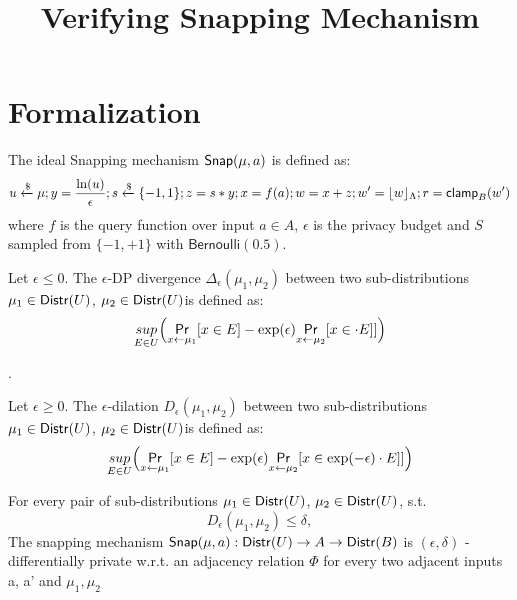 \documentclass{article}
\begin{document}
\title{Verifying Snapping Mechanism}

\maketitle

\section{Formalization}
\begin{defn}
The ideal Snapping mechanism $\mathsf{Snap}(\mu, a)$ is defined as:
\[
	u \xleftarrow{\$} \mu; y = \frac{\ln (u)}{\epsilon}; s \xleftarrow{\$} \{-1, 1\}; z = s * y; x = f(a); w = x + z; w' = \lfloor w \rfloor_{\Lambda}; r = \mathsf{clamp}_B (w')
\]
where $f$ is the query function over input $a \in A$, $\epsilon$ is the privacy budget and $S$ sampled from $ \{-1, +1\}$ with $\mathsf{Bernoulli}(0.5)$.
\end{defn}

\begin{defn}
Let $\epsilon \leq 0$. The $\epsilon${\text -DP divergence} $\Delta_{\epsilon}(\mu_1, \mu_2)$ between two sub-distributions $\mu_1 \in \mathsf{Distr}(U)$, $\mu_2 \in \mathsf{Distr}(U)$is defined as:
\[	
	\underset{E \in U}{sup}\Big(\underset{x \leftarrow \mu_1}{\mathsf{Pr}}[x \in E] - \exp(\epsilon) \underset{x \leftarrow \mu_2}{\mathsf{Pr}}[x \in \cdot E]]\Big)
\]

\end{defn}

\begin{defn}
.

Let $\epsilon \geq 0$. The $\epsilon$-dilation $D_{\epsilon}(\mu_1, \mu_2)$ between two sub-distributions $\mu_1 \in \mathsf{Distr}(U)$, $\mu_2 \in \mathsf{Distr}(U)$is defined as:
\[	
	\underset{E \in U}{sup}\Big(\underset{x \leftarrow \mu_1}{\mathsf{Pr}}[x \in E] - \exp(\epsilon) \underset{x \leftarrow \mu_2}{\mathsf{Pr}}[x \in \exp(-\epsilon) \cdot E]]\Big)
\]
\end{defn}

\begin{prop}
For every pair of sub-distributions $\mu_1 \in \mathsf{Distr}(U)$, $\mu_2 \in \mathsf{Distr}(U)$, s.t. 
\[
D_{\epsilon}(\mu_1, \mu_2) \leq \delta,
\]
The snapping mechanism $\mathsf{Snap}(\mu, a) : \mathsf{Distr}(U) \to A \to \mathsf{Distr}(B)$ is $(\epsilon, \delta)$ - differentially private w.r.t. an adjacency relation $\Phi$ for every two adjacent inputs a, a’ and $\mu_1, \mu_2$
\end{prop}
\end{document}
